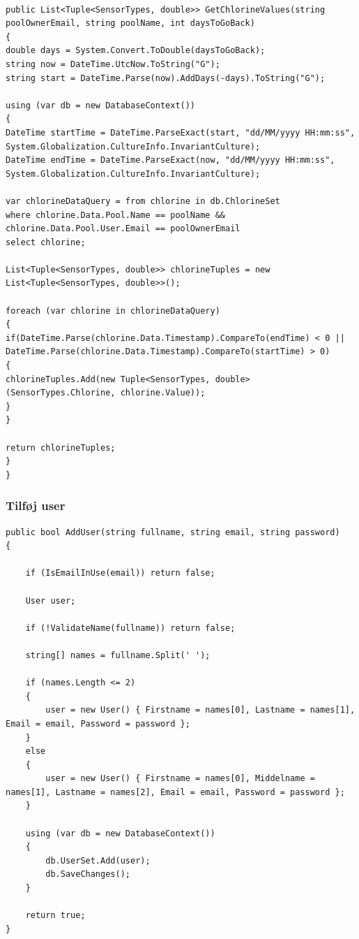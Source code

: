 \begin{lstlisting}[caption= GetChlorineData method, label=code:getChlorineData]

public List<Tuple<SensorTypes, double>> GetChlorineValues(string poolOwnerEmail, string poolName, int daysToGoBack)
{
double days = System.Convert.ToDouble(daysToGoBack);
string now = DateTime.UtcNow.ToString("G");
string start = DateTime.Parse(now).AddDays(-days).ToString("G");

using (var db = new DatabaseContext())
{   
DateTime startTime = DateTime.ParseExact(start, "dd/MM/yyyy HH:mm:ss", System.Globalization.CultureInfo.InvariantCulture);
DateTime endTime = DateTime.ParseExact(now, "dd/MM/yyyy HH:mm:ss", System.Globalization.CultureInfo.InvariantCulture);

var chlorineDataQuery = from chlorine in db.ChlorineSet
where chlorine.Data.Pool.Name == poolName && chlorine.Data.Pool.User.Email == poolOwnerEmail
select chlorine;

List<Tuple<SensorTypes, double>> chlorineTuples = new List<Tuple<SensorTypes, double>>();

foreach (var chlorine in chlorineDataQuery)
{
if(DateTime.Parse(chlorine.Data.Timestamp).CompareTo(endTime) < 0 ||
DateTime.Parse(chlorine.Data.Timestamp).CompareTo(startTime) > 0)
{
chlorineTuples.Add(new Tuple<SensorTypes, double>(SensorTypes.Chlorine, chlorine.Value));
}
}

return chlorineTuples;
}
}
\end{lstlisting}

\subsubsection{Tilføj user}

\begin{lstlisting}[]
public bool AddUser(string fullname, string email, string password)
{

	if (IsEmailInUse(email)) return false;

	User user;

	if (!ValidateName(fullname)) return false;

	string[] names = fullname.Split(' ');

	if (names.Length <= 2)
	{
		user = new User() { Firstname = names[0], Lastname = names[1], Email = email, Password = password };
	}
	else
	{
		user = new User() { Firstname = names[0], Middelname = names[1], Lastname = names[2], Email = email, Password = password };
	}

	using (var db = new DatabaseContext())
	{
		db.UserSet.Add(user);
		db.SaveChanges();
	}

	return true;
}
\end{lstlisting}
